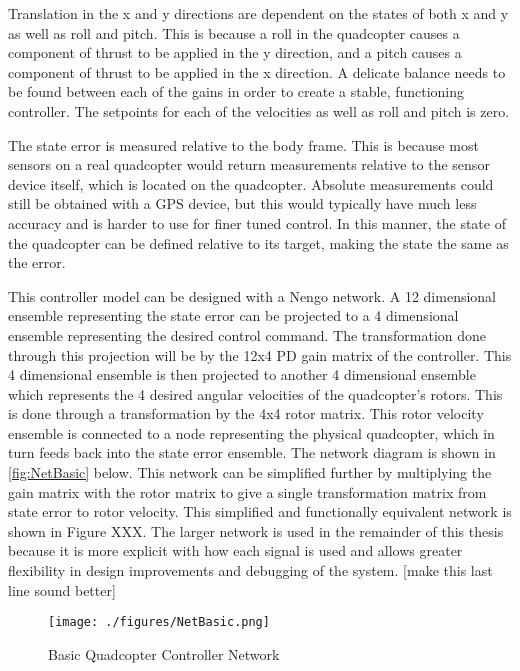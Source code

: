 \documentclass[letterpaper,12pt,titlepage,oneside,final]{book}
\begin{document}
Translation in the x and y directions are dependent on the states of both x and y as well as roll and pitch. 
This is because a roll in the quadcopter causes a component of thrust to be applied in the y direction, and a pitch causes a component of thrust to be applied in the x direction.
A delicate balance needs to be found between each of the gains in order to create a stable, functioning controller. 
The setpoints for each of the velocities as well as roll and pitch is zero.


The state error is measured relative to the body frame. This is because most sensors on a real quadcopter would return measurements relative to the sensor device itself, which is located on the quadcopter. Absolute measurements could still be obtained with a GPS device, but this would typically have much less accuracy and is harder to use for finer tuned control. In this manner, the state of the quadcopter can be defined relative to its target, making the state the same as the error.

This controller model can be designed with a Nengo network. 
A 12 dimensional ensemble representing the state error can be projected to a 4 dimensional ensemble representing the desired control command. 
The transformation done through this projection will be by the 12x4 PD gain matrix of the controller. 
This 4 dimensional ensemble is then projected to another 4 dimensional ensemble which represents the 4 desired angular velocities of the quadcopter’s rotors. 
This is done through a transformation by the 4x4 rotor matrix. 
This rotor velocity ensemble is connected to a node representing the physical quadcopter, which in turn feeds back into the state error ensemble. 
The network diagram is shown in \autoref{fig:NetBasic} below. 
This network can be simplified further by multiplying the gain matrix with the rotor matrix to give a single transformation matrix from state error to rotor velocity. 
This simplified and functionally equivalent network is shown in Figure XXX. The larger network is used in the remainder of this thesis because it is more explicit with how each signal is used and allows greater flexibility in design improvements and debugging of the system. [make this last line sound better]

\begin{figure}
\centering
\texttt{[image: ./figures/NetBasic.png]} %
\caption{Basic Quadcopter Controller Network}
\label{fig:NetBasic}
\end{figure}
\end{document}
